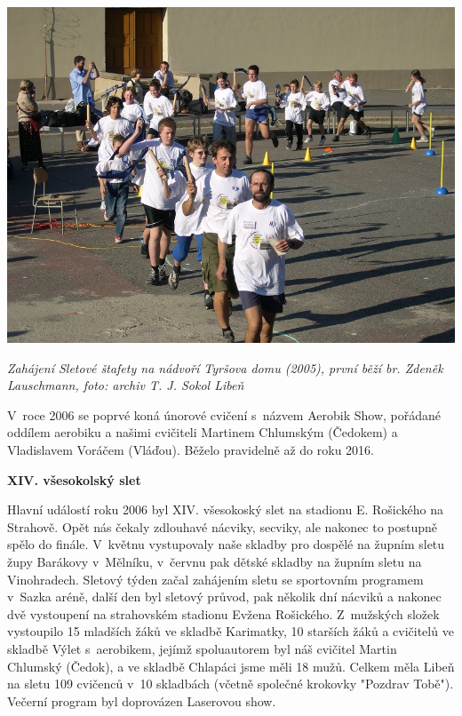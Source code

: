 \documentclass[a5paper, 11pt, twoside]{article}
\begin{document}
 \includegraphics[width=\textwidth]{img/51_stafeta.jpg}

\textit{Zahájení Sletové štafety na nádvoří Tyršova domu (2005), první
běží br. Zdeněk Lauschmann, foto: archiv T. J. Sokol Libeň}

V~roce 2006 se poprvé koná únorové cvičení s~názvem Aerobik Show,
pořádané oddílem aerobiku a našimi cvičiteli Martinem Chlumským
(Čedokem) a Vladislavem Voráčem (Vláďou). Běželo pravidelně až do roku
2016.

\textbf{XIV. všesokolský slet}

Hlavní událostí roku 2006 byl XIV. všesokoský slet na stadionu E.
Rošického na Strahově. Opět nás čekaly zdlouhavé nácviky, secviky, ale
nakonec to postupně spělo do finále. V~květnu vystupovaly naše skladby
pro dospělé na župním sletu župy Barákovy v~Mělníku, v~červnu pak dětské
skladby na župním sletu na Vinohradech. Sletový týden začal zahájením
sletu se sportovním programem v~Sazka aréně, další den byl sletový
průvod, pak několik dní nácviků a nakonec dvě vystoupení na strahovském
stadionu Evžena Rošického. Z~mužských složek vystoupilo 15 mladších žáků
ve skladbě Karimatky, 10 starších žáků a cvičitelů ve skladbě Výlet
s~aerobikem, jejímž spoluautorem byl náš cvičitel Martin Chlumský (Čedok),
a ve skladbě Chlapáci jsme měli 18 mužů. Celkem měla Libeň na sletu 109
cvičenců v~10 skladbách (včetně společné krokovky "Pozdrav Tobě").
Večerní program byl doprovázen Laserovou show.
\end{document}
